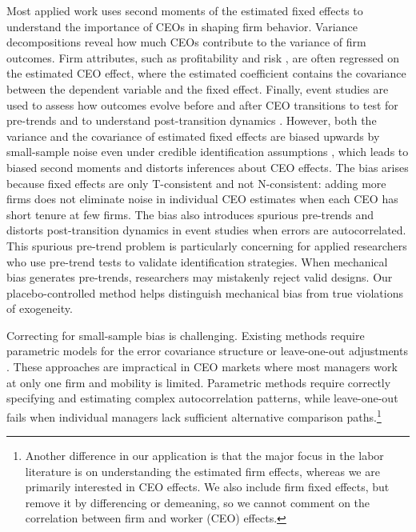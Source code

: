 \documentclass[11pt,a4paper]{article}
\begin{document}
Most applied work uses second moments of the estimated fixed effects to understand the importance of CEOs in shaping firm behavior. Variance decompositions reveal how much CEOs contribute to the variance of firm outcomes. Firm attributes, such as profitability \citep{mackey2008effect} and risk \citep{schoar2024effect}, are often regressed on the estimated CEO effect, where the estimated coefficient contains the covariance between the dependent variable and the fixed effect. Finally, event studies are used to assess how outcomes evolve before and after CEO transitions to test for pre-trends and to understand post-transition dynamics \citep{schoar2024effect}. However, both the variance and the covariance of estimated fixed effects are biased upwards by small-sample noise even under credible identification assumptions
\citep{andrews2008high,gaure2014correlation,Bonhomme2023-dx}, which leads to biased second moments and distorts inferences about CEO effects. The bias arises because fixed effects are only T-consistent and not N-consistent: adding more firms does not eliminate noise in individual CEO estimates when each CEO has short tenure at few firms. The bias also introduces spurious pre-trends and distorts post-transition dynamics in event studies when errors are autocorrelated. This spurious pre-trend problem is particularly concerning for applied researchers who use pre-trend tests to validate identification strategies. When mechanical bias generates pre-trends, researchers may mistakenly reject valid designs. Our placebo-controlled method helps distinguish mechanical bias from true violations of exogeneity.

Correcting for small-sample bias is challenging. Existing methods require parametric models for the error covariance structure \citep{andrews2008high,Bonhomme2019-xi,Bonhomme2023-dx,kline2024firm} or leave-one-out adjustments \citep{kline2020leave}. These approaches are impractical in CEO markets where most managers work at only one firm and mobility is limited. Parametric methods require correctly specifying and estimating complex autocorrelation patterns, while leave-one-out fails when individual managers lack sufficient alternative comparison paths.\footnote{Another difference in our application is that the major focus in the labor literature is on understanding the estimated firm effects, whereas we are primarily interested in CEO effects. We also include firm fixed effects, but remove it by differencing or demeaning, so we cannot comment on the correlation between firm and worker (CEO) effects.}
\end{document}
